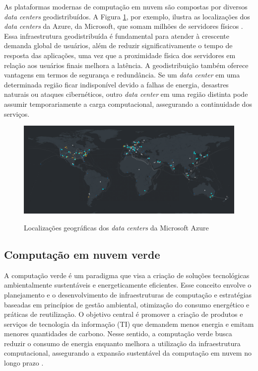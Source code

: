 \documentclass[
	12pt,				%
	oneside,			%
	a4paper,			%
	english,			%
	brazil				%
	]{abntex2ppgsi}
\begin{document}
As plataformas modernas de computação em nuvem são compostas por diversos \textit{data centers} geodistribuídos. A Figura \ref{fig:microsoft-datacenters}, por exemplo, ilustra as localizações dos \textit{data centers} da Azure, da Microsoft, que somam milhões de servidores físicos . Essa infraestrutura geodistribuída é fundamental para atender à crescente demanda global de usuários, além de reduzir significativamente o tempo de resposta das aplicações, uma vez que a proximidade física dos servidores em relação aos usuários finais melhora a latência. A geodistribuição também oferece vantagens em termos de segurança e redundância. Se um \textit{data center} em uma determinada região ficar indisponível devido a falhas de energia, desastres naturais ou ataques cibernéticos, outro \textit{data center} em uma região distinta pode assumir temporariamente a carga computacional, assegurando a continuidade dos serviços.

\begin{figure}[htbp]
	\centering
	\caption{Localizações geográficas dos \textit{data centers} da Microsoft Azure}
		\includegraphics[width=\linewidth]{images/microsoft-datacenters.png}
	\label{fig:microsoft-datacenters}
\end{figure}

\subsection{Computação em nuvem verde}

A computação verde é um paradigma que visa a criação de soluções tecnológicas ambientalmente sustentáveis e energeticamente eficientes. Esse conceito envolve o planejamento e o desenvolvimento de infraestruturas de computação e estratégias baseadas em princípios de gestão ambiental, otimização do consumo energético e práticas de reutilização. O objetivo central é promover a criação de produtos e serviços de tecnologia da informação (TI) que demandem menos energia e emitam menores quantidades de carbono. Nesse sentido, a computação verde busca reduzir o consumo de energia enquanto melhora a utilização da infraestrutura computacional, assegurando a expansão sustentável da computação em nuvem no longo prazo \cite{9793067}.
\end{document}
